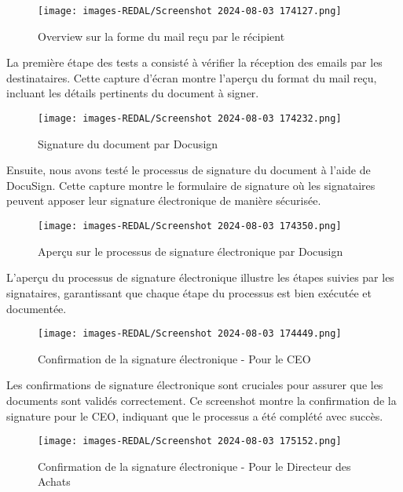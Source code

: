 \begin{figure}[H]
\begin{center}
\texttt{[image: images-REDAL/Screenshot 2024-08-03 174127.png]}
\end{center}
\caption{Overview sur la forme du mail reçu par le récipient}
\end{figure}

La première étape des tests a consisté à vérifier la réception des emails par les destinataires. Cette capture d'écran montre l'aperçu du format du mail reçu, incluant les détails pertinents du document à signer.

\begin{figure}[H]
\begin{center}
\texttt{[image: images-REDAL/Screenshot 2024-08-03 174232.png]}
\end{center}
\caption{Signature du document par Docusign}
\end{figure}

Ensuite, nous avons testé le processus de signature du document à l'aide de DocuSign. Cette capture montre le formulaire de signature où les signataires peuvent apposer leur signature électronique de manière sécurisée.

\begin{figure}[H]
\begin{center}
\texttt{[image: images-REDAL/Screenshot 2024-08-03 174350.png]}
\end{center}
\caption{Aperçu sur le processus de signature électronique par Docusign}
\end{figure}

L'aperçu du processus de signature électronique illustre les étapes suivies par les signataires, garantissant que chaque étape du processus est bien exécutée et documentée.

\begin{figure}[H]
\begin{center}
\texttt{[image: images-REDAL/Screenshot 2024-08-03 174449.png]}
\end{center}
\caption{Confirmation de la signature électronique - Pour le CEO}
\end{figure}

Les confirmations de signature électronique sont cruciales pour assurer que les documents sont validés correctement. Ce screenshot montre la confirmation de la signature pour le CEO, indiquant que le processus a été complété avec succès.

\begin{figure}[H]
\begin{center}
\texttt{[image: images-REDAL/Screenshot 2024-08-03 175152.png]}
\end{center}
\caption{Confirmation de la signature électronique - Pour le Directeur des Achats}
\end{figure}

